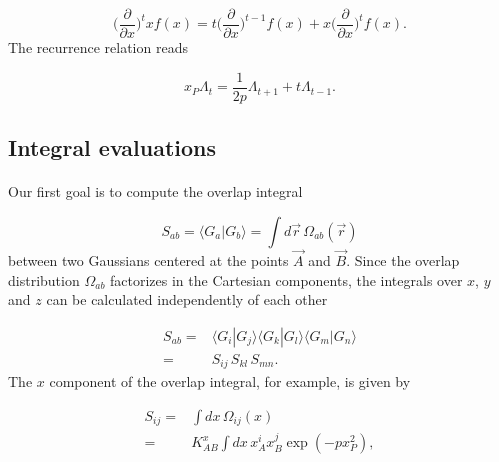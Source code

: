 \documentclass[%
twoside,                 %
final,                   %
10pt]{article}
\begin{document}
\begin{equation}
\label{eq:derivation_rule}
 \Big(\frac{\partial}{\partial x}\Big)^t x f(x) = t\Big(\frac{\partial}{\partial x}\Big)^{t-1}f(x) + x\Big(\frac{\partial}{\partial x}\Big)^t f(x).
\end{equation}
The recurrence relation reads

\begin{equation}
\label{eq:hermite_gaussian_recurrence}
 x_P \Lambda_t = \frac{1}{2p}\Lambda_{t+1} + t\Lambda_{t-1}.
\end{equation}



\subsection*{Integral evaluations}

\paragraph{}

Our first goal is to compute the overlap integral

\begin{equation}
S_{ab}  = \langle G_a|G_b\rangle = \int d\vec r \,\Omega_{ab}(\vec r)
\end{equation}
between two Gaussians centered at the points $\vec A$ and $\vec B$.
Since the overlap distribution $\Omega_{ab}$ factorizes in the Cartesian components, the integrals over $x$, $y$ and $z$ can be calculated independently of each other

\begin{equation}
\begin{split}
 S_{ab} = & \langle G_i|G_j\rangle \langle G_k|G_l\rangle \langle G_m|G_n\rangle \\
        = & S_{ij}\,S_{kl}\,S_{mn}.
\end{split}
\end{equation}
The $x$ component of the overlap integral, for example, is given by

\begin{equation}
\label{eq:intG_ij}
\begin{split}
 S_{ij} = & \int dx \,\Omega_{ij}(x) \\
        = & K_{AB}^x\int dx \,x_A^ix_B^j\exp(-px_P^2),
\end{split}
\end{equation}
\end{document}
